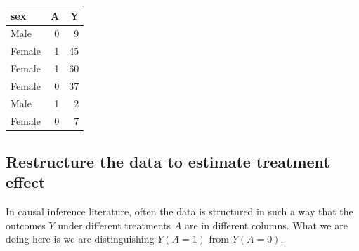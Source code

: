 \documentclass[
]{book}
\begin{document}
\begin{tabular}{l|r|r}
\hline
sex & A & Y\\
\hline
Male & 0 & 9\\
\hline
Female & 1 & 45\\
\hline
Female & 1 & 60\\
\hline
Female & 0 & 37\\
\hline
Male & 1 & 2\\
\hline
Female & 0 & 7\\
\hline
\end{tabular}

\hypertarget{restructure-the-data-to-estimate-treatment-effect}{%
\subsection{Restructure the data to estimate treatment effect}\label{restructure-the-data-to-estimate-treatment-effect}}

In causal inference literature, often the data is structured in such a way that the outcomes \(Y\) under different treatments \(A\) are in different columns. What we are doing here is we are distinguishing \(Y(A=1)\) from \(Y(A=0)\).
\end{document}
